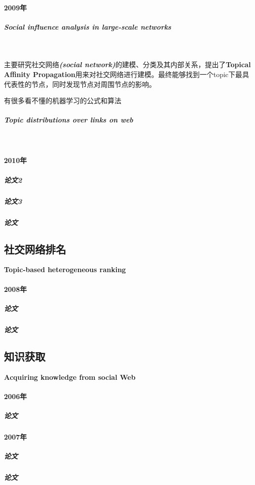 \documentclass[UTF8]{ctexrep}
\begin{document}

\paragraph{2009年}
\subparagraph{Social influence analysis in large-scale networks}~\cite{tang2009social}
    \par 主要研究社交网络\textbf{\textit{(social network)}}的建模、分类及其内部关系，提出了\textbf{Topical Affinity Propagation}用来对社交网络进行建模。最终能够找到一个topic下最具代表性的节点，同时发现节点对周围节点的影响。
    \par 有很多看不懂的机器学习的公式和算法

\subparagraph{Topic distributions over links on web}~\cite{tang2009topic}


\paragraph{2010年}
\subparagraph{论文2~\cite{wang2010mining}}
\subparagraph{论文3~\cite{yang2010social}}
\subparagraph{论文\cite{tan2010social}}


\subsection{社交网络排名}
\textbf{Topic-based heterogeneous ranking}

\paragraph{2008年}
\subparagraph{论文\cite{tang2008topic}}
\subparagraph{论文\cite{tang2008arnetminer}}


\subsection{知识获取}
\textbf{Acquiring knowledge from social Web}

\paragraph{2006年}
\subparagraph{论文\cite{tang2006tree}}

\paragraph{2007年}
\subparagraph{论文\cite{tang2007social}}
\subparagraph{论文 \cite{zhang2007constraint}}
\end{document}

